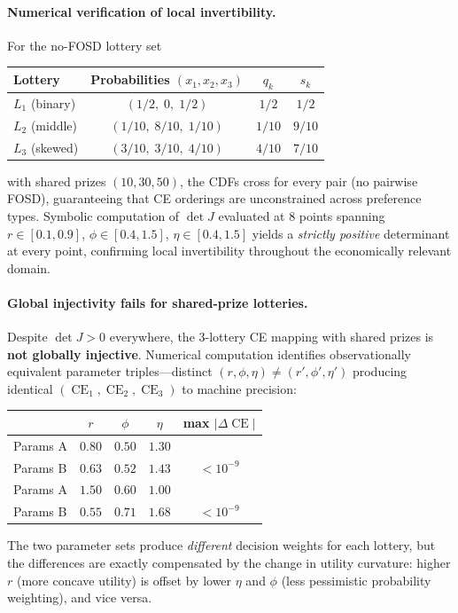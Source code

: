 \documentclass[11pt,a4paper]{article}
\theoremstyle{definition}
\DeclareMathOperator{\CE}{CE}
\begin{document}
\paragraph{Numerical verification of local invertibility.} For the no-FOSD
lottery set
\begin{center}
\begin{tabular}{lccc}
    Lottery & Probabilities $(x_1, x_2, x_3)$ & $q_k$ & $s_k$ \\
    \hline
    $L_1$ (binary)  & $(1/2,\; 0,\; 1/2)$   & $1/2$  & $1/2$ \\
    $L_2$ (middle)  & $(1/10,\; 8/10,\; 1/10)$ & $1/10$ & $9/10$ \\
    $L_3$ (skewed)  & $(3/10,\; 3/10,\; 4/10)$ & $4/10$ & $7/10$ \\
\end{tabular}
\end{center}
with shared prizes $(10, 30, 50)$, the CDFs cross for every pair (no pairwise
FOSD), guaranteeing that CE orderings are unconstrained across preference
types. Symbolic computation of $\det J$ evaluated at 8 points spanning
$r \in [0.1, 0.9]$, $\phi \in [0.4, 1.5]$, $\eta \in [0.4, 1.5]$ yields a
\emph{strictly positive} determinant at every point, confirming local
invertibility throughout the economically relevant domain.

\paragraph{Global injectivity fails for shared-prize lotteries.}
Despite $\det J > 0$ everywhere, the 3-lottery CE mapping with shared prizes
is \textbf{not globally injective}. Numerical computation identifies
observationally equivalent parameter triples---distinct
$(r, \phi, \eta) \neq (r', \phi', \eta')$ producing identical
$(\CE_1, \CE_2, \CE_3)$ to machine precision:
\begin{center}
\begin{tabular}{lcccc}
    & $r$ & $\phi$ & $\eta$ & max $|\Delta\CE|$ \\ \hline
    Params A & $0.80$ & $0.50$ & $1.30$ & \\
    Params B & $0.63$ & $0.52$ & $1.43$ & $< 10^{-9}$ \\[4pt]
    Params A & $1.50$ & $0.60$ & $1.00$ & \\
    Params B & $0.55$ & $0.71$ & $1.68$ & $< 10^{-9}$ \\
\end{tabular}
\end{center}
The two parameter sets produce \emph{different} decision weights for each
lottery, but the differences are exactly compensated by the change in utility
curvature: higher $r$ (more concave utility) is offset by lower $\eta$ and
$\phi$ (less pessimistic probability weighting), and vice versa.
\end{document}
